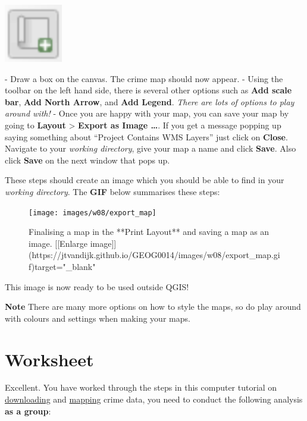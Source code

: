 \documentclass[
]{book}
\begin{document}
\begin{center}\includegraphics[width=1in]{images/w08/add_map} \end{center}

- Draw a box on the canvas. The crime map should now appear.
- Using the toolbar on the left hand side, there is several other options such as \textbf{Add scale bar}, \textbf{Add North Arrow}, and \textbf{Add Legend}. \emph{There are lots of options to play around with!}
- Once you are happy with your map, you can save your map by going to \textbf{Layout} \textgreater{} \textbf{Export as Image \ldots{}}. If you get a message popping up saying something about ``Project Contains WMS Layers'' just click on \textbf{Close}. Navigate to your \emph{working directory}, give your map a name and click \textbf{Save}. Also click \textbf{Save} on the next window that pops up.

These steps should create an image which you should be able to find in your \emph{working directory}. The \textbf{GIF} below summarises these steps:

\begin{figure}

{\centering \texttt{[image: images/w08/export\_map]} 

}

\caption{Finalising a map in the **Print Layout** and saving a map as an image. [[Enlarge image]](https://jtvandijk.github.io/GEOG0014/images/w08/export_map.gif){target="_blank"}}\label{fig:export-map}
\end{figure}

This image is now ready to be used outside QGIS!

\textbf{Note}
There are many more options on how to style the maps, so do play around with colours and settings when making your maps.

\hypertarget{worksheet}{%
\section*{Worksheet}\label{worksheet}}

Excellent. You have worked through the steps in this computer tutorial on \protect\hyperlink{downloading-crime-data}{downloading} and \protect\hyperlink{mapping-crime-data}{mapping} crime data, you need to conduct the following analysis \textbf{as a group}:
\end{document}
